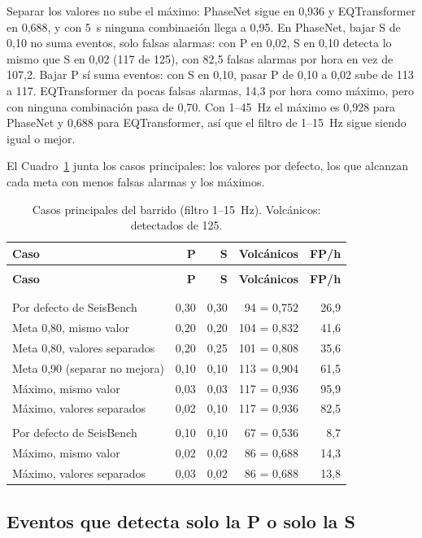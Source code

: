 \documentclass[11pt,a4paper,oneside,spanish,oldfontcommands]{memoir}
\newcommand{\cabecera}[2]{%
  \toprule #1 \\ \midrule \endfirsthead
  \multicolumn{#2}{l}{\itshape Cuadro \thetable{} (continuación)}\\
  \toprule #1 \\ \midrule \endhead
  \midrule \multicolumn{#2}{r}{\itshape Continúa en la página siguiente}\\ \endfoot
  \bottomrule \endlastfoot}
\begin{document}
Separar los valores no sube el máximo: PhaseNet sigue en 0,936 y EQTransformer
en 0,688, y con 5~s ninguna combinación llega a 0,95. En PhaseNet, bajar S de
0,10 no suma eventos, solo falsas alarmas: con P en 0,02, S en 0,10 detecta lo
mismo que S en 0,02 (117 de 125), con 82,5 falsas alarmas por hora en vez de
107,2. Bajar P sí suma eventos: con S en 0,10, pasar P de 0,10 a 0,02 sube de 113
a 117. EQTransformer da pocas falsas alarmas, 14,3 por hora como máximo, pero con
ninguna combinación pasa de 0,70. Con 1--45~Hz el máximo es 0,928 para PhaseNet y
0,688 para EQTransformer, así que el filtro de 1--15~Hz sigue siendo igual o
mejor.

El Cuadro~\ref{tab:ps-casos} junta los casos principales: los valores por
defecto, los que alcanzan cada meta con menos falsas alarmas y los máximos.

{\small
\setlength{\tabcolsep}{5pt}
\begin{longtable}{>{\raggedright\arraybackslash}p{6.2cm}rrrr}
\caption{Casos principales del barrido (filtro 1--15~Hz). Volcánicos: detectados de 125.}\label{tab:ps-casos}\\
\cabecera{\textbf{Caso} & \textbf{P} & \textbf{S} & \textbf{Volcánicos} & \textbf{FP/h}}{5}
\multicolumn{5}{l}{\textit{PhaseNet}}\\
\addlinespace
Por defecto de SeisBench & 0,30 & 0,30 & 94 = 0,752 & 26,9 \\
Meta 0,80, mismo valor & 0,20 & 0,20 & 104 = 0,832 & 41,6 \\
Meta 0,80, valores separados & 0,20 & 0,25 & 101 = 0,808 & 35,6 \\
Meta 0,90 (separar no mejora) & 0,10 & 0,10 & 113 = 0,904 & 61,5 \\
Máximo, mismo valor & 0,03 & 0,03 & 117 = 0,936 & 95,9 \\
Máximo, valores separados & 0,02 & 0,10 & 117 = 0,936 & 82,5 \\
\midrule
\multicolumn{5}{l}{\textit{EQTransformer}}\\
\addlinespace
Por defecto de SeisBench & 0,10 & 0,10 & 67 = 0,536 & 8,7 \\
Máximo, mismo valor & 0,02 & 0,02 & 86 = 0,688 & 14,3 \\
Máximo, valores separados & 0,03 & 0,02 & 86 = 0,688 & 13,8 \\
\end{longtable}
}

\subsection*{Eventos que detecta solo la P o solo la S}
\end{document}
